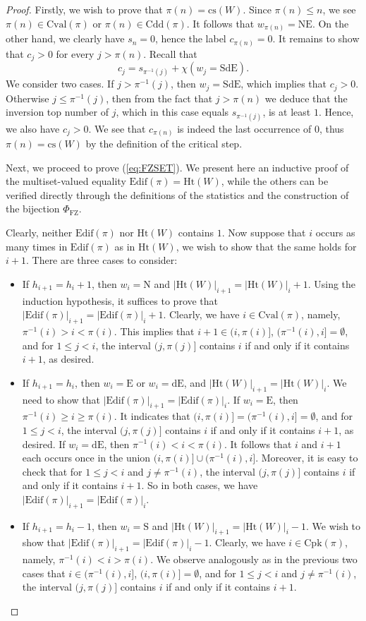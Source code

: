 \documentclass[12pt]{amsart}
\numberwithin{equation}{section}
\theoremstyle{plain}
\theoremstyle{definition}
\def\FZ{\mathrm{FZ}}
\def\N{\mathrm{N}}
\def\S{\mathrm{S}}
\def\E{\mathrm{E}}
\def\dE{\mathrm{dE}}
\def\NE{\mathrm{NE}}
\def\SdE{\mathrm{SdE}}
\def\cs{\mathrm{cs}}
\def\Het{\mathrm{Ht}}
\def\Edif{\mathrm{Edif}}
\def\Cpk{\mathrm{Cpk}}
\def\Cval{\mathrm{Cval}}
\def\Cdd{\mathrm{Cdd}}
\begin{document}
\begin{proof}
Firstly, we wish to prove that $\pi(n)=\cs(W)$.
Since $\pi(n) \leq n$, we see $\pi(n)\in \Cval(\pi)$ or $\pi(n)\in \Cdd(\pi)$. It follows that $w_{\pi(n)}=\NE$. On the other hand, we clearly have $s_n=0$, hence the label $c_{\pi(n)}=0$. It remains to show that $c_j>0$ for every $j>\pi(n)$. Recall that
$$c_j=s_{\pi^{-1}(j)}+\chi(w_j=\SdE).$$
We consider two cases. If $j > \pi^{-1}(j)$, then $w_j=\SdE$, which implies that $c_j>0$. Otherwise $j \leq \pi^{-1}(j)$, then from the fact that $j>\pi(n)$ we deduce that the inversion top number of $j$, which in this case equals $s_{\pi^{-1}(j)}$, is at least $1$. Hence, we also have $c_j>0$. We see that $c_{\pi(n)}$ is indeed the last occurrence of $0$, thus $\pi(n)=\cs(W)$ by the definition of the critical step.

Next, we proceed to prove (\ref{eq:FZSET}).
We present here an inductive proof of the multiset-valued equality $\Edif(\pi)=\Het(W)$, while the others can be verified directly through the definitions of the statistics and the construction of the bijection $\Phi_{\FZ}$.

Clearly, neither $\Edif(\pi)$ nor $\Het(W)$ contains $1$. Now suppose that $i$ occurs as many times in $\Edif(\pi)$ as in $\Het(W)$, we wish to show that the same holds for $i+1$. There are three cases to consider:
\begin{itemize}
    \item If $h_{i+1}=h_{i}+1$, then $w_{i}=\N$ and $|\Het(W)|_{i+1}=|\Het(W)|_{i}+1$. Using the induction hypothesis, it suffices to prove that $|\Edif(\pi)|_{i+1}=|\Edif(\pi)|_{i}+1$. Clearly, we have $i \in \Cval(\pi)$, namely, $\pi^{-1}(i)>i<\pi(i)$. This implies that $i+1 \in (i,\pi(i)]$, $(\pi^{-1}(i),i]=\emptyset$, and for $1 \leq j < i$, the interval $(j,\pi(j)]$ contains $i$ if and only if it contains $i+1$, as desired.
    \item If $h_{i+1}=h_{i}$, then $w_{i}=\E$ or $w_{i}=\dE$, and $|\Het(W)|_{i+1}=|\Het(W)|_{i}$. We need to show that $|\Edif(\pi)|_{i+1}=|\Edif(\pi)|_{i}$. If $w_{i}=\E$, then $\pi^{-1}(i) \geq i \geq \pi(i)$. It indicates that $(i,\pi(i)]=(\pi^{-1}(i),i]=\emptyset$, and for $1 \leq j < i$, the interval $(j,\pi(j)]$ contains $i$ if and only if it contains $i+1$, as desired. If $w_{i}=\dE$, then $\pi^{-1}(i)<i<\pi(i)$. It follows that $i$ and $i+1$ each occurs once in the union $(i,\pi(i)]\cup (\pi^{-1}(i),i]$. Moreover, it is easy to check that for $1 \leq j < i$ and $j \neq \pi^{-1}(i)$, the interval $(j,\pi(j)]$ contains $i$ if and only if it contains $i+1$. So in both cases, we have $|\Edif(\pi)|_{i+1}=|\Edif(\pi)|_{i}$.
    \item If $h_{i+1}=h_{i}-1$, then $w_{i}=\S$ and $|\Het(W)|_{i+1}=|\Het(W)|_{i}-1$. We wish to show that $|\Edif(\pi)|_{i+1}=|\Edif(\pi)|_{i}-1$. Clearly, we have $i \in \Cpk(\pi)$, namely, $\pi^{-1}(i)<i>\pi(i)$. We observe analogously as in the previous two cases that $i\in (\pi^{-1}(i),i]$, $(i,\pi(i)]=\emptyset$, and for $1 \leq j < i$ and $j \neq \pi^{-1}(i)$, the interval $(j,\pi(j)]$ contains $i$ if and only if it contains $i+1$.
\end{itemize}


\end{proof}
\end{document}
